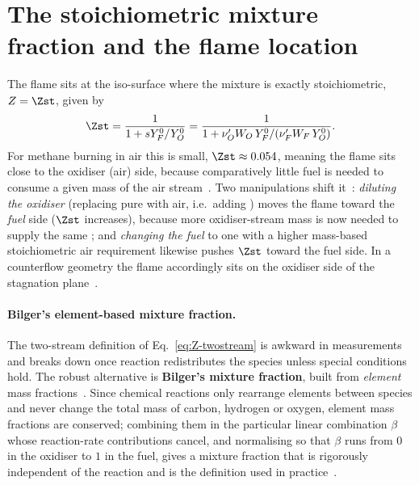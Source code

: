 \section{The stoichiometric mixture fraction and the flame location}

The flame sits at the iso-surface where the mixture is exactly stoichiometric, $Z=\Zst$, given by
\begin{equation}
\Zst=\frac{1}{1+sY_F^0/Y_O^0}=\frac{1}{1+\nu_O' W_O\,Y_F^0/(\nu_F' W_F\,Y_O^0)} .
\label{eq:Zst}
\end{equation}
For methane burning in air this is small, $\Zst\approx0.054$, meaning the flame sits close to the oxidiser (air) side, because comparatively little fuel is needed to consume a given mass of the air stream~\cite{transcript_l9}. Two manipulations shift it~\cite{transcript_l9}: \emph{diluting the oxidiser} (replacing pure  with air, i.e.\ adding ) moves the flame toward the \emph{fuel} side ($\Zst$ increases), because more oxidiser-stream mass is now needed to supply the same ; and \emph{changing the fuel} to one with a higher mass-based stoichiometric air requirement likewise pushes $\Zst$ toward the fuel side. In a counterflow geometry the flame accordingly sits on the oxidiser side of the stagnation plane~\cite{transcript_l9}.

\paragraph{Bilger's element-based mixture fraction.}
The two-stream definition of Eq.~\eqref{eq:Z-twostream} is awkward in measurements and breaks down once reaction redistributes the species unless special conditions hold. The robust alternative is \textbf{Bilger's mixture fraction}, built from \emph{element} mass fractions~\cite{lecture9,poinsot2011theoretical}. Since chemical reactions only rearrange elements between species and never change the total mass of carbon, hydrogen or oxygen, element mass fractions are conserved; combining them in the particular linear combination $\beta$ whose reaction-rate contributions cancel, and normalising so that $\beta$ runs from $0$ in the oxidiser to $1$ in the fuel, gives a mixture fraction that is rigorously independent of the reaction and is the definition used in practice~\cite{lecture9,transcript_l9}.


